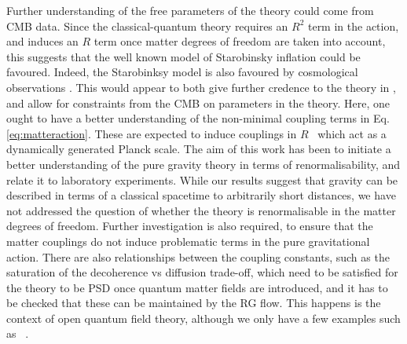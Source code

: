 \documentclass[aps,preprintnumbers,superscriptaddress,longbibliography]{revtex4-1}
\begin{document}
Further understanding of the free parameters of the theory could come from CMB data. Since the classical-quantum theory requires an $R^2$ term in the action, and induces an $R$ term once matter degrees of freedom are taken into account, this suggests that the well known model of Starobinsky inflation \cite{starobinsky1980new, vilenkin1985classical,liu2018inflation} could be favoured. Indeed, the Starobinksy model is also favoured by cosmological observations \cite{akrami2020planck}. This would appear to both give further credence to the theory in \cite{oppenheim2018post,oppenheim2023covariant}, and allow for constraints from the CMB on parameters in the theory. Here, one ought to have 
a better understanding of the non-minimal coupling terms in Eq. \eqref{eq:matteraction}. These are expected to induce couplings in $R$~\cite{adler1982einstein} which act as a dynamically generated Planck scale. The aim of this work has been to initiate a better understanding of the pure gravity theory in terms of renormalisability, and relate it to laboratory experiments. While our results suggest that gravity can be described in terms of a classical spacetime to arbitrarily short distances, we have not addressed the question of whether the theory is renormalisable in the matter degrees of freedom. Further investigation is also required, to ensure that the matter couplings do not induce problematic terms in the pure gravitational action.  There are also relationships between the coupling constants, such as the saturation of the decoherence vs diffusion trade-off, which need to be satisfied for the theory to be PSD once quantum matter fields are introduced, and it has to be checked that these can be maintained by the RG flow. This happens is the context of open quantum field theory, although we only have a few examples such as ~\cite{baidya2017renormalization}.
\end{document}
